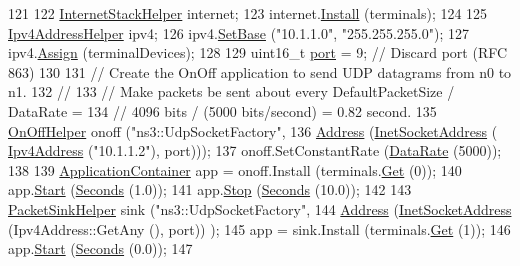 \begin{DoxyCode}
121 
122   \hyperlink{classns3_1_1InternetStackHelper}{InternetStackHelper} internet;
123   internet.\hyperlink{classns3_1_1InternetStackHelper_a6645b412f31283d2d9bc3d8a95cebbc0}{Install} (terminals);
124 
125   \hyperlink{classns3_1_1Ipv4AddressHelper}{Ipv4AddressHelper} ipv4;
126   ipv4.\hyperlink{classns3_1_1Ipv4AddressHelper_acf7b16dd25bac67e00f5e25f90a9a035}{SetBase} (\textcolor{stringliteral}{"10.1.1.0"}, \textcolor{stringliteral}{"255.255.255.0"});
127   ipv4.\hyperlink{classns3_1_1Ipv4AddressHelper_af8e7f4a1a7e74c00014a1eac445a27af}{Assign} (terminalDevices);
128 
129   uint16\_t \hyperlink{dsdv-manet_8cc_a8e0798404bf2cf5dabb84c5ba9a4f236}{port} = 9;   \textcolor{comment}{// Discard port (RFC 863)}
130 
131   \textcolor{comment}{// Create the OnOff application to send UDP datagrams from n0 to n1.}
132   \textcolor{comment}{//}
133   \textcolor{comment}{// Make packets be sent about every DefaultPacketSize / DataRate = }
134   \textcolor{comment}{// 4096 bits / (5000 bits/second) = 0.82 second.}
135   \hyperlink{classns3_1_1OnOffHelper}{OnOffHelper} onoff (\textcolor{stringliteral}{"ns3::UdpSocketFactory"}, 
136                      \hyperlink{classns3_1_1Address}{Address} (\hyperlink{classns3_1_1InetSocketAddress}{InetSocketAddress} (
      \hyperlink{classns3_1_1Ipv4Address}{Ipv4Address} (\textcolor{stringliteral}{"10.1.1.2"}), port)));
137   onoff.SetConstantRate (\hyperlink{classns3_1_1DataRate}{DataRate} (5000));
138 
139   \hyperlink{classns3_1_1ApplicationContainer}{ApplicationContainer} app = onoff.Install (terminals.\hyperlink{classns3_1_1NodeContainer_a9ed96e2ecc22e0f5a3d4842eb9bf90bf}{Get} (0));
140   app.\hyperlink{classns3_1_1ApplicationContainer_a8eff87926507020bbe3e1390358a54a7}{Start} (\hyperlink{group__timecivil_ga33c34b816f8ff6628e33d5c8e9713b9e}{Seconds} (1.0));
141   app.\hyperlink{classns3_1_1ApplicationContainer_adfc52f9aa4020c8714679b00bbb9ddb3}{Stop} (\hyperlink{group__timecivil_ga33c34b816f8ff6628e33d5c8e9713b9e}{Seconds} (10.0));
142 
143   \hyperlink{classns3_1_1PacketSinkHelper}{PacketSinkHelper} sink (\textcolor{stringliteral}{"ns3::UdpSocketFactory"},
144                          \hyperlink{classns3_1_1Address}{Address} (\hyperlink{classns3_1_1InetSocketAddress}{InetSocketAddress} (Ipv4Address::GetAny (), port))
      );
145   app = sink.Install (terminals.\hyperlink{classns3_1_1NodeContainer_a9ed96e2ecc22e0f5a3d4842eb9bf90bf}{Get} (1));
146   app.\hyperlink{classns3_1_1ApplicationContainer_a8eff87926507020bbe3e1390358a54a7}{Start} (\hyperlink{group__timecivil_ga33c34b816f8ff6628e33d5c8e9713b9e}{Seconds} (0.0));
147 

\end{DoxyCode}
